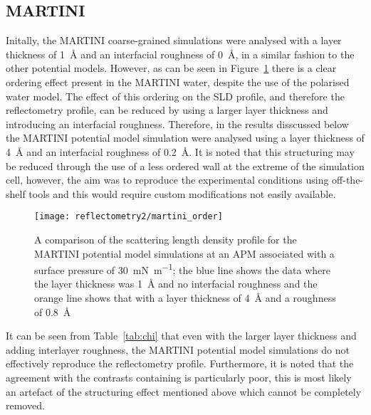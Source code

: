 \subsection{MARTINI}
Initally, the MARTINI coarse-grained simulations were analysed with a layer thickness of \SI{1}{\angstrom} and an interfacial roughness of \SI{0}{\angstrom}, in a similar fashion to the other potential models.
However, as can be seen in Figure~\ref{fig:martorder} there is a clear ordering effect present in the MARTINI water, despite the use of the polarised water model.
The effect of this ordering on the SLD profile, and therefore the reflectometry profile, can be reduced by using a larger layer thickness and introducing an interfacial roughness.
Therefore, in the results disscussed below the MARTINI potential model simulation were analysed using a layer thickness of \SI{4}{\angstrom} and an interfacial roughness of \SI{0.2}{\angstrom}.
It is noted that this structuring may be reduced through the use of a less ordered wall \cite{koutsioubas_combined_2016} at the extreme of the simulation cell, however, the aim was to reproduce the experimental conditions using off-the-shelf tools and this would require custom modifications not easily available.
%
\begin{figure}
    \centering
    \texttt{[image: reflectometry2/martini\_order]}
    \caption{A comparison of the scattering length density profile for the MARTINI potential model simulations at an APM associated with a surface pressure of \SI{30}{\milli\newton\per\meter}; the blue line shows the data where the layer thickness was \SI{1}{\angstrom} and no interfacial roughness and the orange line shows that with a layer thickness of \SI{4}{\angstrom} and a roughness of \SI{0.8}{\angstrom}}
    \label{fig:martorder}
\end{figure}
%

It can be seen from Table~\ref{tab:chi} that even with the larger layer thickness and adding interlayer roughness, the MARTINI potential model simulations do not effectively reproduce the reflectometry profile.
Furthermore, it is noted that the agreement with the contrasts containing  is particularly poor, this is most likely an artefact of the structuring effect mentioned above which cannot be completely removed.

